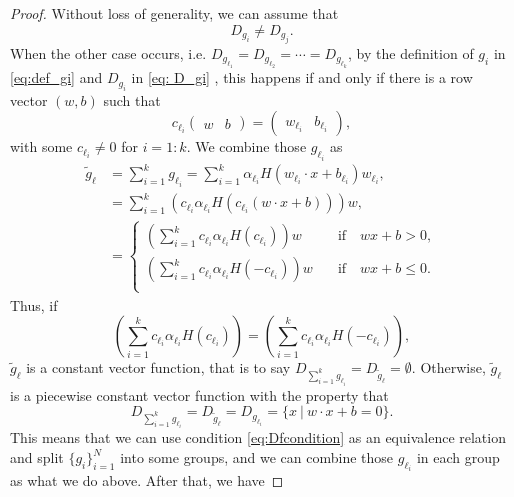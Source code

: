 \begin{proof}
	
	Without loss of generality, we can assume that 
	\begin{equation}\label{eq:assumD_gi}
	D_{g_i} \neq D_{g_j}.
	\end{equation}
	When the other case occurs, i.e. $D_{g_{\ell_1}} = D_{g_{\ell_2}} = \cdots= D_{g_{\ell_k}}$, by the definition of $g_i$ in \eqref{eq:def_gi} and $D_{g_i}$ in \eqref{eq: D_gi} , 
	this happens if and only if there is a row vector $(w, b)$ such that
	\begin{equation}\label{eq:Dfcondition}
	c_{\ell_i}\begin{pmatrix}
	w &
	b
	\end{pmatrix} =  
	\begin{pmatrix}
	w_{\ell_i} &
	b_{\ell_i}
	\end{pmatrix},
	\end{equation}
	with some $c_{\ell_i} \neq 0$ for $i = 1:k$.  We combine those $g_{\ell_i}$ as
	\begin{equation*}
	\begin{aligned}\label{mergeH}
	\tilde g_{\ell} &= \sum_{i=1}^k g_{\ell_i} = \sum_{i=1}^k \alpha_{\ell_i} H(w_{\ell_i} \cdot  x + b_{\ell_i}) w_{\ell_i}, \\
	&= \sum_{i=1}^k \left( c_{\ell_i}\alpha_{\ell_i} H\left(c_{\ell_i}(w\cdot   x + b)\right) \right) w, \\
	&=\begin{cases}
	\displaystyle \left(\sum_{i=1}^k  c_{\ell_i}\alpha_{\ell_i} H(c_{\ell_i}) \right) w  \quad &\text{if} \quad w x + b > 0,\\
	\displaystyle \left(\sum_{i=1}^k  c_{\ell_i}\alpha_{\ell_i} H(-c_{\ell_i}) \right) w  \quad &\text{if} \quad w x + b \le 0.\\
	\end{cases}
	\end{aligned}
	\end{equation*}	
	Thus, if 
	$$
	\left(\sum_{i=1}^k  c_{\ell_i}\alpha_{\ell_i} H(c_{\ell_i}) \right)  = \left(\sum_{i=1}^k  c_{\ell_i}\alpha_{\ell_i} H(-c_{\ell_i}) \right),
	$$
	$\tilde g_\ell$ is a constant vector function, that is to say $D_{\sum_{i=1}^k g_{\ell_i}} = D_{\tilde g_\ell} = \emptyset$. 
	Otherwise, $\tilde g_\ell$ is a piecewise constant vector function with the property that 
	$$
	D_{\sum_{i=1}^k g_{\ell_i}} = D_{\tilde g_\ell} = D_{g_{\ell_i}} = \{ x ~|~ w\cdot  x + b = 0\}.
	$$
	This means that we can use condition \eqref{eq:Dfcondition} as an equivalence relation and split $\{g_i\}_{i=1}^N$ into some groups, and we can combine those $g_{\ell_i}$ in each group as what we do above. After that, we have

\end{proof}
